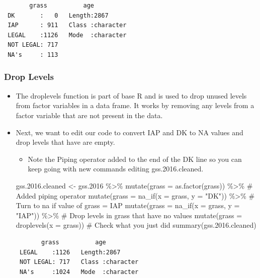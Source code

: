\documentclass[
  letterpaper,
  DIV=11,
  numbers=noendperiod]{scrreprt}
\newenvironment{Shaded}{\begin{snugshade}}{\end{snugshade}}
\newcommand{\AttributeTok}[1]{\textcolor[rgb]{0.40,0.45,0.13}{#1}}
\newcommand{\CommentTok}[1]{\textcolor[rgb]{0.37,0.37,0.37}{#1}}
\newcommand{\FloatTok}[1]{\textcolor[rgb]{0.68,0.00,0.00}{#1}}
\newcommand{\FunctionTok}[1]{\textcolor[rgb]{0.28,0.35,0.67}{#1}}
\newcommand{\NormalTok}[1]{\textcolor[rgb]{0.00,0.23,0.31}{#1}}
\newcommand{\OtherTok}[1]{\textcolor[rgb]{0.00,0.23,0.31}{#1}}
\newcommand{\SpecialCharTok}[1]{\textcolor[rgb]{0.37,0.37,0.37}{#1}}
\newcommand{\StringTok}[1]{\textcolor[rgb]{0.13,0.47,0.30}{#1}}
\providecommand{\tightlist}{%
  \setlength{\itemsep}{0pt}\setlength{\parskip}{0pt}}\usepackage{longtable,booktabs,array}
\begin{document}
\begin{verbatim}
       grass          age           
 DK       :   0   Length:2867       
 IAP      : 911   Class :character  
 LEGAL    :1126   Mode  :character  
 NOT LEGAL: 717                     
 NA's     : 113                     
\end{verbatim}

\subsubsection{Drop Levels}\label{drop-levels}

\begin{itemize}
\item
  The droplevels function is part of base R and is used to drop unused
  levels from factor variables in a data frame. It works by removing any
  levels from a factor variable that are not present in the data.
\item
  Next, we want to edit our code to convert IAP and DK to NA values and
  drop levels that have are empty.

  \begin{itemize}
  \tightlist
  \item
    Note the Piping operator added to the end of the DK line so you can
    keep going with new commands editing gss.2016.cleaned.
  \end{itemize}

\begin{Shaded}
\begin{Highlighting}[]
\NormalTok{gss.}\FloatTok{2016.}\NormalTok{cleaned }\OtherTok{\textless{}{-}}\NormalTok{ gss}\FloatTok{.2016} \SpecialCharTok{\%\textgreater{}\%}
    \FunctionTok{mutate}\NormalTok{(}\AttributeTok{grass =} \FunctionTok{as.factor}\NormalTok{(grass)) }\SpecialCharTok{\%\textgreater{}\%}
    \CommentTok{\# Added piping operator}
\FunctionTok{mutate}\NormalTok{(}\AttributeTok{grass =} \FunctionTok{na\_if}\NormalTok{(}\AttributeTok{x =}\NormalTok{ grass, }\AttributeTok{y =} \StringTok{"DK"}\NormalTok{)) }\SpecialCharTok{\%\textgreater{}\%}
    \CommentTok{\# Turn to na if value of grass = IAP}
\FunctionTok{mutate}\NormalTok{(}\AttributeTok{grass =} \FunctionTok{na\_if}\NormalTok{(}\AttributeTok{x =}\NormalTok{ grass, }\AttributeTok{y =} \StringTok{"IAP"}\NormalTok{)) }\SpecialCharTok{\%\textgreater{}\%}
    \CommentTok{\# Drop levels in grass that have no values}
\FunctionTok{mutate}\NormalTok{(}\AttributeTok{grass =} \FunctionTok{droplevels}\NormalTok{(}\AttributeTok{x =}\NormalTok{ grass))}
\CommentTok{\# Check what you just did}
\FunctionTok{summary}\NormalTok{(gss.}\FloatTok{2016.}\NormalTok{cleaned)}
\end{Highlighting}
\end{Shaded}

\begin{verbatim}
       grass          age           
 LEGAL    :1126   Length:2867       
 NOT LEGAL: 717   Class :character  
 NA's     :1024   Mode  :character  
\end{verbatim}
\end{itemize}
\end{document}
